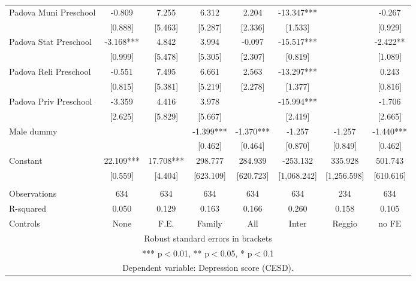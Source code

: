 \begin{tabular}{lccccccc}
Padova Muni Preschool & -0.809 & 7.255 & 6.312 & 2.204 & -13.347*** &  & -0.267 \\
 & [0.888] & [5.463] & [5.287] & [2.336] & [1.533] &  & [0.929] \\
Padova Stat Preschool & -3.168*** & 4.842 & 3.994 & -0.097 & -15.517*** &  & -2.422** \\
 & [0.999] & [5.478] & [5.305] & [2.307] & [0.819] &  & [1.089] \\
Padova Reli Preschool & -0.551 & 7.495 & 6.661 & 2.563 & -13.297*** &  & 0.243 \\
 & [0.815] & [5.381] & [5.219] & [2.278] & [1.377] &  & [0.816] \\
Padova Priv Preschool & -3.359 & 4.416 & 3.978 &  & -15.994*** &  & -1.706 \\
 & [2.625] & [5.829] & [5.667] &  & [2.419] &  & [2.665] \\
Male dummy &  &  & -1.399*** & -1.370*** & -1.257 & -1.257 & -1.440*** \\
 &  &  & [0.462] & [0.464] & [0.870] & [0.849] & [0.462] \\
Constant & 22.109*** & 17.708*** & 298.777 & 284.939 & -253.132 & 335.928 & 501.743 \\
 & [0.559] & [4.404] & [623.109] & [620.723] & [1,068.242] & [1,256.598] & [610.616] \\
 &  &  &  &  &  &  &  \\
Observations & 634 & 634 & 634 & 634 & 634 & 234 & 634 \\
R-squared & 0.050 & 0.129 & 0.163 & 0.166 & 0.260 & 0.158 & 0.105 \\
 Controls & None & F.E. & Family & All & Inter & Reggio & no FE \\ \hline
\multicolumn{8}{c}{ Robust standard errors in brackets} \\
\multicolumn{8}{c}{ *** p$<$0.01, ** p$<$0.05, * p$<$0.1} \\
\multicolumn{8}{c}{ Dependent variable: Depression score (CESD).} \\
\end{tabular}
